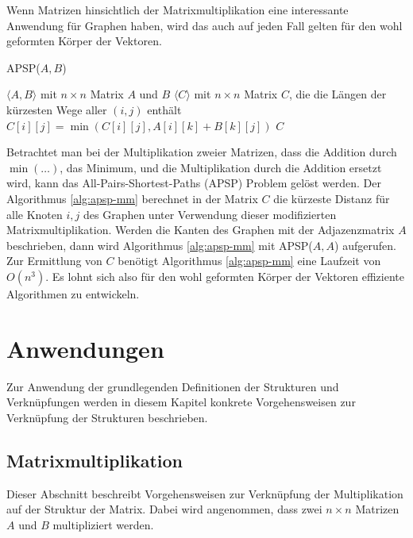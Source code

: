 \documentclass{report}
\numberwithin{equation}{section}
\begin{document}
Wenn Matrizen hinsichtlich der Matrixmultiplikation eine interessante Anwendung für Graphen haben, wird das auch auf jeden Fall gelten für den wohl geformten Körper der Vektoren.
\begin{algorithm}
	\caption{APSP($A, B$)}
	\label{alg:apsp-mm}
	\begin{algorithmic}[1]
		\Require $\langle A, B\rangle$ mit $n \times n$ Matrix $A$ und $B$
		\Ensure $\langle C\rangle$ mit $n \times n$ Matrix $C$, die die Längen der kürzesten Wege aller $(i, j)$ enthält
		\State $C[i][j] = \min(C[i][j], A[i][k] + B[k][j])$
		\EndIf
		\EndFor
		\EndFor
		\EndFor
		\State \Return $C$
	\end{algorithmic}
\end{algorithm}
Betrachtet man bei der Multiplikation zweier Matrizen, dass die Addition durch $\min(\ldots)$, das Minimum, und die Multiplikation durch die Addition ersetzt wird, kann das All-Pairs-Shortest-Paths (APSP) Problem gelöst werden. Der Algorithmus \ref{alg:apsp-mm} berechnet in der Matrix $C$ die kürzeste Distanz für alle Knoten $i, j$ des Graphen unter Verwendung dieser modifizierten Matrixmultiplikation. Werden die Kanten des Graphen mit der Adjazenzmatrix $A$ beschrieben, dann wird Algorithmus \ref{alg:apsp-mm} mit APSP($A, A$) aufgerufen. Zur Ermittlung von $C$ benötigt Algorithmus \ref{alg:apsp-mm} eine Laufzeit von $O(n^3)$. Es lohnt sich also für den wohl geformten Körper der Vektoren effiziente Algorithmen zu entwickeln.

\chapter{Anwendungen}
\label{chap:anwendungen}
Zur Anwendung der grundlegenden Definitionen der Strukturen und Verknüpfungen werden in diesem Kapitel konkrete Vorgehensweisen zur Verknüpfung der Strukturen beschrieben.

\section{Matrixmultiplikation}
Dieser Abschnitt beschreibt Vorgehensweisen zur Verknüpfung der Multiplikation auf der Struktur der Matrix. Dabei wird angenommen, dass zwei $n \times n$ Matrizen $A$ und $B$ multipliziert werden.
\end{document}

